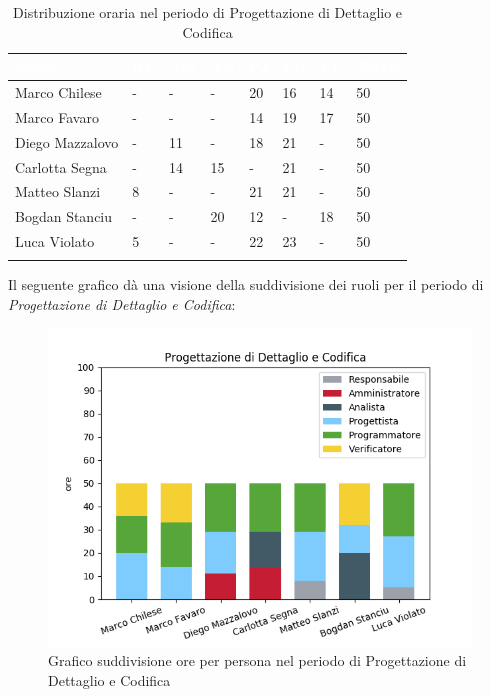 \begin{longtable}{|C{.30\textwidth}|C{.06\textwidth}|C{.06\textwidth}|C{.06\textwidth} | C{.06\textwidth}| C{.06\textwidth} | C{.06\textwidth} | C{.10\textwidth} |}
	\hline
		\textbf{\textcolor{white}{Nome}} & \textbf{\textcolor{white}{RE}} & \textbf{\textcolor{white}{AM}} & \textbf{\textcolor{white}{AN}} & \textbf{\textcolor{white}{PJ}} & \textbf{\textcolor{white}{PR}} & \textbf{\textcolor{white}{VE}} & \textbf{\textcolor{white}{Totale}}\\
	\hline 
	Marco Chilese & - & - & - & 20 & 16 & 14 & 50 \\
	\hline
	Marco Favaro &  - & - & - & 14 & 19 & 17 & 50 \\
	\hline
	Diego Mazzalovo & - & 11 & - & 18 & 21 & - & 50 \\
	\hline
	Carlotta Segna & - & 14 & 15 & - & 21 & - & 50 \\
	\hline
	Matteo Slanzi & 8 & - & - & 21 & 21 & - & 50 \\
	\hline
	Bogdan Stanciu & - & - & 20 & 12 & - & 18 & 50 \\
	\hline
	Luca Violato & 5 & - & - & 22 & 23 & - & 50 \\   
	\hline


\caption{Distribuzione oraria nel periodo di Progettazione di Dettaglio e Codifica}
\label{Distribuzione oraria pdc}
\end{longtable}

Il seguente grafico dà una visione della suddivisione dei ruoli per il periodo di \textit{Progettazione di Dettaglio e Codifica}:

\begin{figure}[H]
	\centering
	\includegraphics[width=0.8\linewidth]{./images/fig_pdc.png}
	\caption{Grafico suddivisione ore per persona nel periodo di Progettazione di Dettaglio e Codifica}
	\label{fig:grafico suddivione ruoli periodo pdc}
\end{figure}


